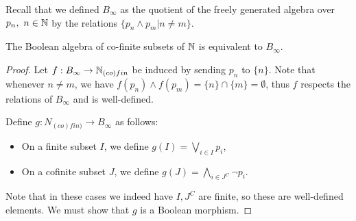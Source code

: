 Recall that we defined $B_\infty$ as the quotient of the freely generated algebra 
over $p_n,~n\in\mathbb{N}$ by the relations $\{p_n \wedge p_m | n\neq m\}$. 

\begin{lemma}\label{N-co-fin-cp}
  The Boolean algebra of co-finite subsets of $\mathbb{N}$
  is equivalent to $B_\infty$. 
\end{lemma}
\begin{proof}
  Let $f:B_\infty \to \mathbb{N}_{(co)fin}$ be induced by sending $p_n$ to $\{n\}$. 
  Note that whenever $n\neq m$, we have 
  $f(p_n)\wedge f(p_m) = \{n\} \cap \{m\} = \emptyset$, 
  thus $f$ respects the relations of $B_\infty$ and is well-defined.

  Define $g:N_{(co)fin)} \to B_\infty$ as follows:
  \begin{itemize}
    \item On a finite subset $I$, we define $g(I) = \bigvee_{i\in I} p_i$, 
    \item On a cofinite subset $J$, we define $g(J) = \bigwedge _{i \in J^C} \neg p_i$. 
  \end{itemize}
  Note that in these cases we indeed have $I,J^C$ are finite, so these are well-defined elements. 
  We must show that $g$ is a Boolean morphism. 


\end{proof}
